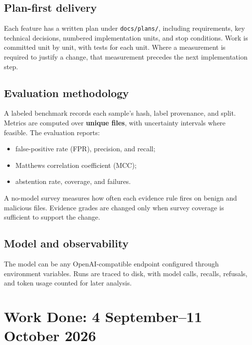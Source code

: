 \documentclass[11pt,a4paper]{article}
\newcommand{\code}[1]{\texttt{\small #1}}
\begin{document}
\subsection{Plan-first delivery}
Each feature has a written plan under \code{docs/plans/}, including requirements, key technical decisions, numbered implementation units, and stop conditions. Work is committed unit by unit, with tests for each unit. Where a measurement is required to justify a change, that measurement precedes the next implementation step.

\subsection{Evaluation methodology}
A labeled benchmark records each sample's hash, label provenance, and split. Metrics are computed over \textbf{unique files}, with uncertainty intervals where feasible. The evaluation reports:
\begin{itemize}
  \item false-positive rate (FPR), precision, and recall;
  \item Matthews correlation coefficient (MCC);
  \item abstention rate, coverage, and failures.
\end{itemize}
A no-model survey measures how often each evidence rule fires on benign and malicious files. Evidence grades are changed only when survey coverage is sufficient to support the change.

\subsection{Model and observability}
The model can be any OpenAI-compatible endpoint configured through environment variables. Runs are traced to disk, with model calls, recalls, refusals, and token usage counted for later analysis.

\section{Work Done: 4 September--11 October 2026}
\end{document}
